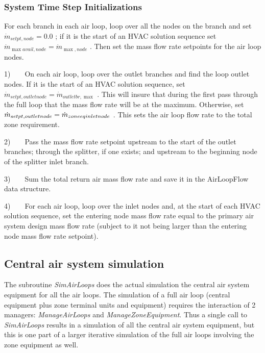 \subsubsection{System Time Step Initializations}\label{system-time-step-initializations}

For each branch in each air loop, loop over all the nodes on the branch and set \({\dot m_{setpt,node}} = 0.0\) ; if it is the start of an HVAC solution sequence set \({\dot m_{\max avail,node}} = {\dot m_{\max ,node}}\) . Then set the mass flow rate setpoints for the air loop nodes.

1)~~~~On each air loop, loop over the outlet branches and find the loop outlet nodes. If it is the start of an HVAC solution sequence, set \({\dot m_{setpt,outletnode}} = {\dot m_{outletbr,\max }}\) . This will insure that during the first pass through the full loop that the mass flow rate will be at the maximum. Otherwise, set \({\dot m_{setpt,outletnode}} = {\dot m_{zone{\rm{ }}eq{\rm{ }}inletnode}}\) . This sets the air loop flow rate to the total zone requirement.

2)~~~~Pass the mass flow rate setpoint upstream to the start of the outlet branches; through the splitter, if one exists; and upstream to the beginning node of the splitter inlet branch.

3)~~~~Sum the total return air mass flow rate and save it in the AirLoopFlow data structure.

4)~~~~For each air loop, loop over the inlet nodes and, at the start of each HVAC solution sequence, set the entering node mass flow rate equal to the primary air system design mass flow rate (subject to it not being larger than the entering node mass flow rate setpoint).

\subsection{Central air system simulation}\label{central-air-system-simulation}

The subroutine \emph{SimAirLoops} does the actual simulation the central air system equipment for all the air loops. The simulation of a full air loop (central equipment plus zone terminal units and equipment) requires the interaction of 2 managers: \emph{ManageAirLoops} and \emph{ManageZoneEquipment}. Thus a single call to \emph{SimAirLoops} results in a simulation of all the central air system equipment, but this is one part of a larger iterative simulation of the full air loops involving the zone equipment as well.


